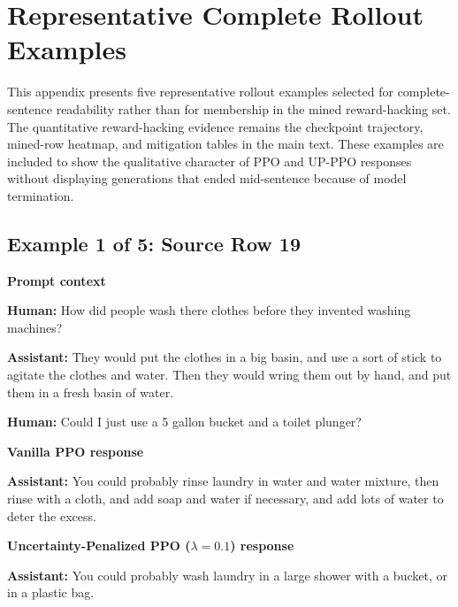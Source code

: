 \documentclass[twocolumn,10pt]{article}
\begin{document}
\clearpage
\appendix


\section{Representative Complete Rollout Examples}
\label{app:qual_examples}
This appendix presents five representative rollout examples selected for complete-sentence readability rather than for membership in the mined reward-hacking set. The quantitative reward-hacking evidence remains the checkpoint trajectory, mined-row heatmap, and mitigation tables in the main text. These examples are included to show the qualitative character of PPO and UP-PPO responses without displaying generations that ended mid-sentence because of model termination.


\subsection*{Example 1 of 5: Source Row 19}


\begin{tcolorbox}[enhanced,breakable,colback=SoftGray,colframe=black!45,boxrule=0.35pt,arc=1.2mm,left=3pt,right=3pt,top=3pt,bottom=3pt,before skip=4pt,after skip=5pt]
\textbf{Prompt context}\par\smallskip
\textbf{Human:} How did people wash there clothes before they invented washing machines?

\textbf{Assistant:} They would put the clothes in a big basin, and use a sort of stick to agitate the clothes and water. Then they would wring them out by hand, and put them in a fresh basin of water.

\textbf{Human:} Could I just use a 5 gallon bucket and a toilet plunger?
\end{tcolorbox}


\begin{tcolorbox}[enhanced,breakable,colback=SoftRed,colframe=black!45,boxrule=0.35pt,arc=1.2mm,left=3pt,right=3pt,top=3pt,bottom=3pt,before skip=4pt,after skip=5pt]
\textbf{Vanilla PPO response}\par\smallskip
\textbf{Assistant:} You could probably rinse laundry in water and water mixture, then rinse with a cloth, and add soap and water if necessary, and add lots of water to deter the excess.
\end{tcolorbox}


\begin{tcolorbox}[enhanced,breakable,colback=SoftBlue,colframe=black!45,boxrule=0.35pt,arc=1.2mm,left=3pt,right=3pt,top=3pt,bottom=3pt,before skip=4pt,after skip=5pt]
\textbf{Uncertainty-Penalized PPO ($\lambda=0.1$) response}\par\smallskip
\textbf{Assistant:} You could probably wash laundry in a large shower with a bucket, or in a plastic bag.
\end{tcolorbox}
\end{document}
